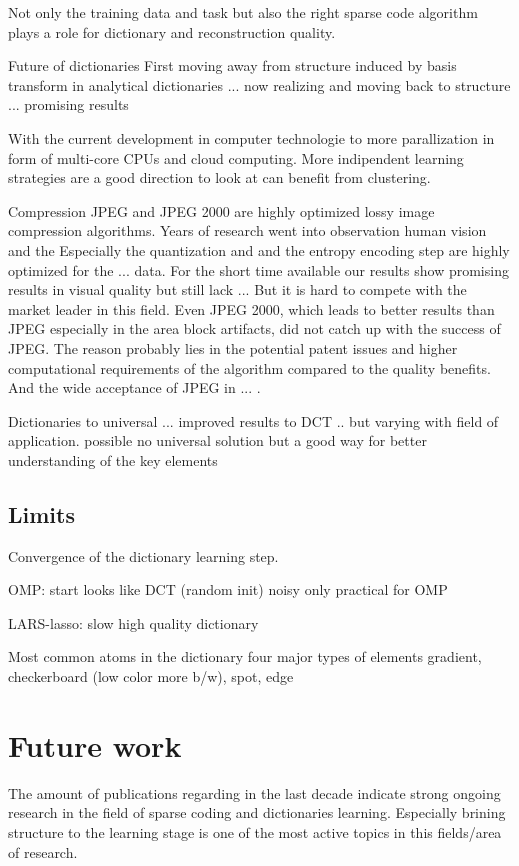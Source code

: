 Not only the training data and task but also the right
sparse code algorithm plays a role for dictionary and reconstruction quality.

Future of dictionaries
First moving away from structure induced by basis transform in analytical
dictionaries ... now realizing and moving back to structure ... promising
results\cite{?,?,?}

With the current development in computer technologie to more
parallization in form of multi-core CPUs and cloud computing. 
More indipendent learning strategies are a good direction to look at can
benefit from clustering. 

Compression 
JPEG and JPEG 2000 are highly optimized lossy image compression algorithms. 
Years of research went into observation human vision and the 
Especially the quantization and and the entropy encoding step are highly
optimized for the ... data.
For the short time available our results show promising results in visual
quality but still lack ...
But it is hard to compete with the market leader in this field.  Even JPEG 2000,
which leads to better results than JPEG especially in the area block artifacts,
did not catch up with the success of JPEG. 
The reason probably lies in the potential patent issues and higher computational
requirements of the algorithm compared
to the quality benefits. And the wide acceptance of JPEG in ...
.


Dictionaries to universal ... improved results to DCT .. but varying with field
of application. possible no universal solution but a good way for better
understanding of the key elements 

\subsection*{Limits}
Convergence of the dictionary learning step.

OMP:
  start looks like DCT (random init)
  noisy
  only practical for OMP

LARS-lasso:
  slow 
  high quality dictionary

  Most common atoms in the dictionary 
  four major types of elements
  gradient, checkerboard (low color more b/w), spot, edge

\section{Future work}
The amount of publications regarding in
the last decade indicate strong ongoing research in the field of sparse coding
and dictionaries learning. Especially brining structure to the learning stage is
one of the most active topics in this fields/area of research. 

